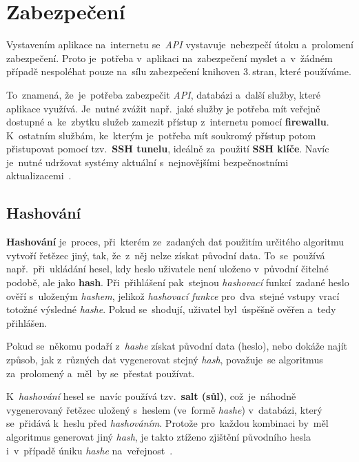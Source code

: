 \documentclass[11pt,a4paper]{report}
\let\oldacrshort\acrshort
\renewcommand{\acrshort}[1]{\emph{\normalsize\color[rgb]{0,0,0}\noindent\oldacrshort{#1}}}
\begin{document}
        \section{Zabezpečení}
            Vystavením aplikace na~internetu se~\acrshort{API} vystavuje~nebezpečí útoku a~prolomení zabezpečení. Proto je~potřeba v~aplikaci na~zabezpečení myslet a~v~žádném případě nespoléhat pouze na~sílu zabezpečení knihoven 3.\,stran, které používáme.
            
            To~znamená, že~je~potřeba zabezpečit \acrshort{API}, databázi a~další služby, které aplikace využívá. Je~nutné zvážit např.~jaké služby je potřeba mít veřejně dostupné a~ke~zbytku služeb zamezit přístup z~internetu pomocí \textbf{firewallu}. K~ostatním službám, ke~kterým je~potřeba mít soukromý přístup potom přistupovat pomocí tzv.~\textbf{SSH tunelu}, ideálně za~použití \textbf{SSH klíče}. Navíc je~nutné udržovat systémy aktuální s~nejnovějšími bezpečnostními aktualizacemi~\cite{graham2021ethical, Dorman:webmappingajax}.
            
            \subsection{Hashování}
                \textbf{Hashování} je~proces, při~kterém ze~zadaných dat použitím určitého algoritmu vytvoří řetězec jiný, tak, že~z~něj nelze získat původní data. To~se~používá např.~při~ukládání hesel, kdy heslo uživatele není uloženo v~původní čitelné podobě, ale jako \textbf{hash}. Při~přihlášení pak~stejnou \emph{hashovací} funkcí~zadané heslo ověří s~uloženým \emph{hashem}, jelikož \emph{hashovací funkce} pro~dva~stejné vstupy vrací totožné výsledné \emph{hashe}. Pokud se~shodují, uživatel byl~úspěšně ověřen a~tedy přihlášen.
                
                Pokud se~někomu podaří z~\emph{hashe} získat původní data (heslo), nebo dokáže najít způsob, jak z~různých dat vygenerovat stejný \emph{hash}, považuje~se algoritmus za~prolomený a~měl~by se~přestat používat.
                
                K~\emph{hashování} hesel se~navíc používá tzv.~\textbf{salt (sůl)}, což~je~náhodně vygenerovaný řetězec uložený s~heslem (ve~formě \emph{hashe}) v~databázi, který se~přidává k~heslu před \emph{hashováním}. Protože pro~každou kombinaci by~měl algoritmus generovat jiný \emph{hash}, je takto ztíženo zjištění původního hesla i~v~případě úniku \emph{hashe} na~veřejnost~\cite{graham2021ethical}.
        
\end{document}
